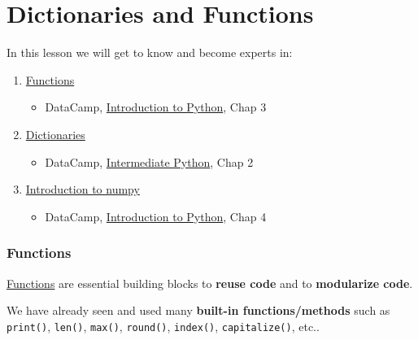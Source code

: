 \documentclass[
  letterpaper,
  DIV=11,
  numbers=noendperiod]{scrreprt}
\providecommand{\tightlist}{%
  \setlength{\itemsep}{0pt}\setlength{\parskip}{0pt}}\usepackage{longtable,booktabs,array}
\begin{document}
\hypertarget{dictionaries-and-functions}{%
\chapter{Dictionaries and Functions}\label{dictionaries-and-functions}}

In this lesson we will get to know and become experts in:

\begin{enumerate}
\def\labelenumi{\arabic{enumi}.}
\tightlist
\item
  \protect\hyperlink{Functions}{Functions}

  \begin{itemize}
  \tightlist
  \item
    DataCamp,
    \href{https://app.datacamp.com/learn/courses/intro-to-python-for-data-science}{Introduction
    to Python}, Chap 3
  \end{itemize}
\item
  \protect\hyperlink{Dictionaries}{Dictionaries}

  \begin{itemize}
  \tightlist
  \item
    DataCamp,
    \href{https://campus.datacamp.com/courses/intermediate-python}{Intermediate
    Python}, Chap 2
  \end{itemize}
\item
  \protect\hyperlink{Introduction-to-numpy}{Introduction to numpy}

  \begin{itemize}
  \tightlist
  \item
    DataCamp,
    \href{https://app.datacamp.com/learn/courses/intro-to-python-for-data-science}{Introduction
    to Python}, Chap 4
  \end{itemize}
\end{enumerate}

\hypertarget{functions}{%
\subsection{Functions}\label{functions}}

\href{https://wesmckinney.com/book/python-builtin.html\#functions}{Functions}
are essential building blocks to \textbf{reuse code} and to
\textbf{modularize code}.

We have already seen and used many \textbf{built-in functions/methods}
such as \texttt{print()}, \texttt{len()}, \texttt{max()},
\texttt{round()}, \texttt{index()}, \texttt{capitalize()}, etc..
\end{document}
